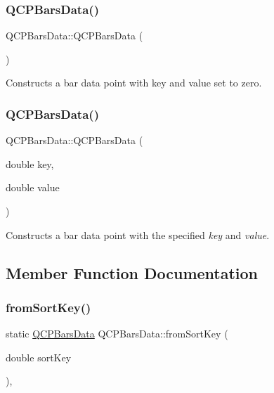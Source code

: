 \subsubsection{\texorpdfstring{Q\+C\+P\+Bars\+Data()}{QCPBarsData()}\hspace{0.1cm}{\footnotesize\ttfamily [1/2]}}
{\footnotesize\ttfamily Q\+C\+P\+Bars\+Data\+::\+Q\+C\+P\+Bars\+Data (\begin{DoxyParamCaption}{ }\end{DoxyParamCaption})}

Constructs a bar data point with key and value set to zero. \mbox{\label{class_q_c_p_bars_data_a4158816a69e2c675885f48afa2b5acc9}} 
\subsubsection{\texorpdfstring{Q\+C\+P\+Bars\+Data()}{QCPBarsData()}\hspace{0.1cm}{\footnotesize\ttfamily [2/2]}}
{\footnotesize\ttfamily Q\+C\+P\+Bars\+Data\+::\+Q\+C\+P\+Bars\+Data (\begin{DoxyParamCaption}\item[{double}]{key,  }\item[{double}]{value }\end{DoxyParamCaption})}

Constructs a bar data point with the specified {\itshape key} and {\itshape value}. 

\subsection{Member Function Documentation}
\mbox{\label{class_q_c_p_bars_data_ad170d4e90498005ec319338910252ba8}} 
\subsubsection{\texorpdfstring{from\+Sort\+Key()}{fromSortKey()}}
{\footnotesize\ttfamily static \hyperlink{class_q_c_p_bars_data}{Q\+C\+P\+Bars\+Data} Q\+C\+P\+Bars\+Data\+::from\+Sort\+Key (\begin{DoxyParamCaption}\item[{double}]{sort\+Key }\end{DoxyParamCaption})\hspace{0.3cm}{\ttfamily [inline]}, {\ttfamily [static]}}

